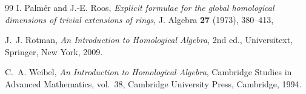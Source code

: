 \documentclass[11pt,reqno]{amsart}
\theoremstyle{plain}
\theoremstyle{definition}
\theoremstyle{remark}
\begin{document}
\begin{thebibliography}{99}
I. Palm\'er and J.-E. Roos,
\emph{Explicit formulae for the global homological dimensions of trivial extensions of rings},
J. Algebra \textbf{27} (1973), 380--413,

J.~J. Rotman,
\emph{An Introduction to Homological Algebra}, 2nd ed.,
Universitext, Springer, New York, 2009.

C.~A. Weibel,
\emph{An Introduction to Homological Algebra},
Cambridge Studies in Advanced Mathematics, vol.~38,
Cambridge University Press, Cambridge, 1994.

\end{thebibliography}
\end{document}
